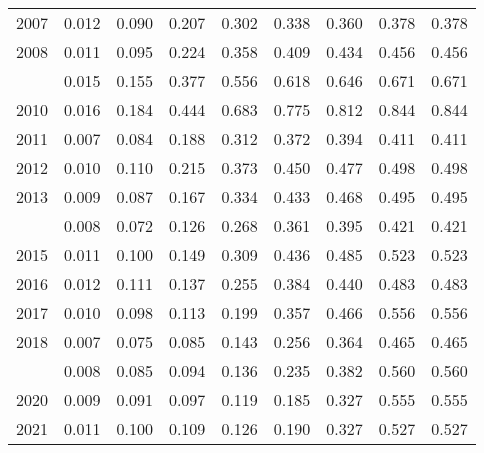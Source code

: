 \documentclass[
]{article}
\begin{document}
\begin{longtable}[t]{lrrrrrrrr}
2007 & 0.012 & 0.090 & 0.207 & 0.302 & 0.338 & 0.360 & 0.378 & 0.378\\
2008 & 0.011 & 0.095 & 0.224 & 0.358 & 0.409 & 0.434 & 0.456 & 0.456\\
\addlinespace
2009 & 0.015 & 0.155 & 0.377 & 0.556 & 0.618 & 0.646 & 0.671 & 0.671\\
2010 & 0.016 & 0.184 & 0.444 & 0.683 & 0.775 & 0.812 & 0.844 & 0.844\\
2011 & 0.007 & 0.084 & 0.188 & 0.312 & 0.372 & 0.394 & 0.411 & 0.411\\
2012 & 0.010 & 0.110 & 0.215 & 0.373 & 0.450 & 0.477 & 0.498 & 0.498\\
2013 & 0.009 & 0.087 & 0.167 & 0.334 & 0.433 & 0.468 & 0.495 & 0.495\\
\addlinespace
2014 & 0.008 & 0.072 & 0.126 & 0.268 & 0.361 & 0.395 & 0.421 & 0.421\\
2015 & 0.011 & 0.100 & 0.149 & 0.309 & 0.436 & 0.485 & 0.523 & 0.523\\
2016 & 0.012 & 0.111 & 0.137 & 0.255 & 0.384 & 0.440 & 0.483 & 0.483\\
2017 & 0.010 & 0.098 & 0.113 & 0.199 & 0.357 & 0.466 & 0.556 & 0.556\\
2018 & 0.007 & 0.075 & 0.085 & 0.143 & 0.256 & 0.364 & 0.465 & 0.465\\
\addlinespace
2019 & 0.008 & 0.085 & 0.094 & 0.136 & 0.235 & 0.382 & 0.560 & 0.560\\
2020 & 0.009 & 0.091 & 0.097 & 0.119 & 0.185 & 0.327 & 0.555 & 0.555\\
2021 & 0.011 & 0.100 & 0.109 & 0.126 & 0.190 & 0.327 & 0.527 & 0.527\\*
\end{longtable}
\end{document}
